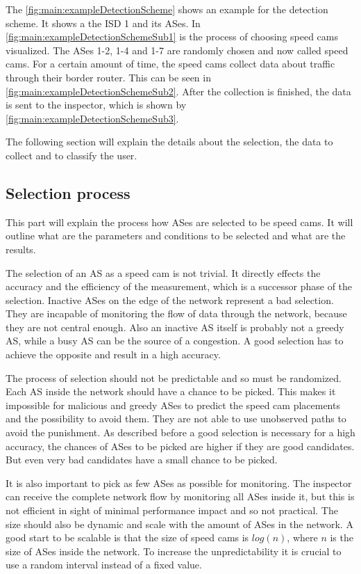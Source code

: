 \documentclass[thesis.tex]{subfiles}
\begin{document}
The \autoref{fig:main:exampleDetectionScheme} shows an example for the detection scheme. It shows a the ISD 1 and its ASes. In \autoref{fig:main:exampleDetectionSchemeSub1} is the process of choosing speed cams visualized. The ASes 1-2, 1-4 and 1-7 are randomly chosen and now called speed cams. For a certain amount of time, the speed cams collect data about traffic through their border router. This can be seen in \autoref{fig:main:exampleDetectionSchemeSub2}. After the collection is finished, the data is sent to the inspector, which is shown by \autoref{fig:main:exampleDetectionSchemeSub3}.

The following section will explain the details about the selection, the data to collect and to classify the user.

\subsection{Selection process}
This part will explain the process how ASes are selected to be speed cams. It will outline what are the parameters and conditions to be selected and what are the results.

The selection of an AS as a speed cam is not trivial. It directly effects the accuracy and the efficiency of the measurement, which is a successor phase of the selection. Inactive ASes on the edge of the network represent a bad selection. They are incapable of monitoring the flow of data through the network, because they are not central enough. Also an inactive AS itself is probably not a greedy AS, while a busy AS can be the source of a congestion. A good selection has to achieve the opposite and result in a high accuracy.

The process of selection should not be predictable and so must be randomized. Each AS inside the network should have a chance to be picked. This makes it impossible for malicious and greedy ASes to predict the speed cam placements and the possibility to avoid them. They are not able to use unobserved paths to avoid the punishment. As described before a good selection is necessary for a high accuracy, the chances of ASes to be picked are higher if they are good candidates. But even very bad candidates have a small chance to be picked.

It is also important to pick as few ASes as possible for monitoring. The inspector can receive the complete network flow by monitoring all ASes inside it, but this is not efficient in sight of minimal performance impact and so not practical. The size should also be dynamic and scale with the amount of ASes in the network. A good start to be scalable is that the size of speed cams is $log(n)$, where $n$ is the size of ASes inside the network. To increase the unpredictability it is crucial to use a random interval instead of a fixed value. 
\end{document}
